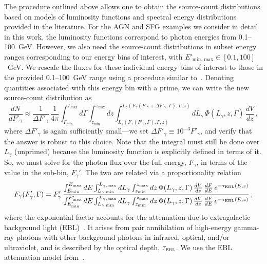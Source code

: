 The procedure outlined above allows one to obtain the source-count distributions based on models of luminosity functions and spectral energy distributions provided in the literature. For the AGN and SFG examples we consider in detail in this work, the luminosity functions correspond to photon energies from 0.1--100~GeV.  However, we also need the source-count distributions in subset energy ranges corresponding to our energy bins of interest, with $E'_\text{min, max}\in [0.1, 100]$~GeV.  We rescale the fluxes for these individual energy bins of interest to those in the provided 0.1--100~GeV range using a procedure similar to~\cite{DiMauro:2014wha}. Denoting quantities associated with this energy bin with a prime, we can write the new source-count distribution as
\begin{equation}
\frac{dN}{dF'_\gamma}\approx \frac{1}{\Delta F'_\gamma} \, \frac{1}{4\pi} \int_{\Gamma_\text{min}}^{\Gamma_\text{max}} d\Gamma \int_{z_\text{min}}^{z_\text{max}} dz \int_{L_\gamma(F_\gamma(F'_\gamma,\Gamma),\Gamma,z)}^{L_\gamma(F_\gamma(F'_\gamma+\Delta F'_\gamma,\Gamma),\Gamma,z)} dL_\gamma \, \Phi(L_\gamma,z,\Gamma) \, \frac{dV}{dz} \, ,
\label{eq: dNdFprime}
\end{equation}
where $\Delta F'_\gamma$ is again sufficiently small---we set $\Delta F'_\gamma \equiv 10^{-3} F'_\gamma$, and verify that the answer is robust to this choice. Note that the integral must still be done over $L_\gamma$ (unprimed) because the luminosity function is explicitly defined in terms of it.  So, we must solve for the photon flux over the full energy, $F_\gamma$, in terms of the value in the sub-bin, $F_\gamma'$.  The two are related via a proportionality relation
\begin{equation}
F_\gamma(F'_\gamma,\Gamma) = F'_\gamma \, \frac{\int_{E_\text{min}}^{E_\text{max}}  dE \int_{L_{\gamma,\text{min}}}^{L_{\gamma,\text{max}}} dL_{\gamma}\int_{z_\text{min}}^{z_\text{max}} dz \,  \Phi(L_\gamma,z,\Gamma) \, \frac{dV}{dz} \, \frac{dF}{dE}\,e^{-\tau_\text{\tiny{EBL}}(E,z)}}{\int_{E'_\text{min}}^{E'_\text{max}}  dE \int_{L_{\gamma,\text{min}}}^{L_{\gamma,\text{max}}} dL_{\gamma}\int_{z_\text{min}}^{z_\text{max}} dz \, \Phi(L_\gamma,z,\Gamma) \, \frac{dV}{dz} \, \frac{dF}{dE}\,e^{-\tau_\text{\tiny{EBL}}(E,z)}} \, ,
\end{equation}
where the exponential factor accounts for the attenuation due to extragalactic background light (EBL)~\cite{Gould:1966pza, Fazio:1970pr, 1992ApJ...390L..49S, Franceschini:2008tp, 2012Sci...338.1190A,Abramowski:2012ry,Dominguez:2013lfa}.  It arises from pair annihilation of high-energy gamma-ray photons with other background photons in infrared, optical, and/or ultraviolet, and is described by the optical depth, $\tau_\text{\tiny{EBL}}$.  We use the EBL attenuation model from~\cite{2010ApJ...712..238F}.  


